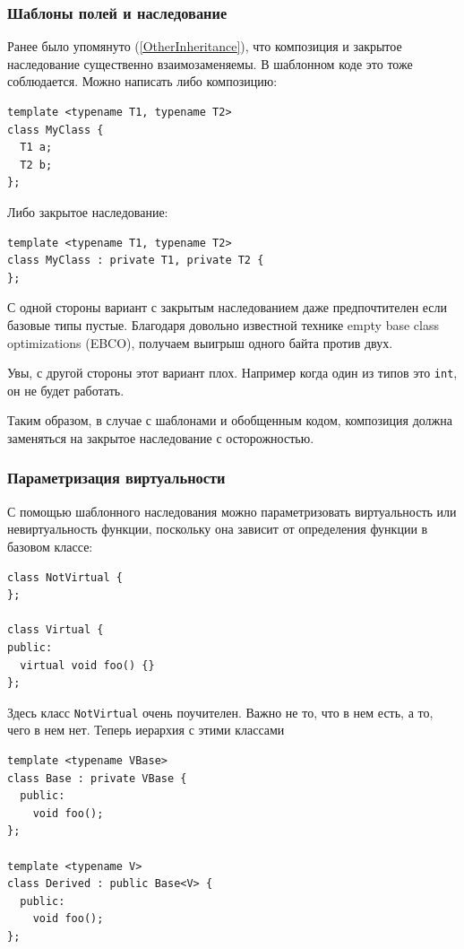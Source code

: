 \documentclass[a4paper,12pt,oneside]{article}
\begin{document}
\subsubsection{Шаблоны полей и наследование}\label{TemplPrivate}

Ранее было упомянуто (\ref{OtherInheritance}), что композиция и закрытое наследование существенно взаимозаменяемы. В шаблонном коде это тоже соблюдается. Можно написать либо композицию:

\begin{lstlisting}
template <typename T1, typename T2> 
class MyClass { 
  T1 a; 
  T2 b; 
}; 
\end{lstlisting}

Либо закрытое наследование:

\begin{lstlisting}
template <typename T1, typename T2> 
class MyClass : private T1, private T2 { 
}; 
\end{lstlisting}

С одной стороны вариант с закрытым наследованием даже предпочтителен если базовые типы пустые. Благодаря довольно известной технике empty base class optimizations (EBCO), получаем выигрыш одного байта против двух.

Увы, с другой стороны этот вариант плох. Например когда один из типов это \lstinline!int!, он не будет работать.

Таким образом, в случае с шаблонами и обобщенным кодом, композиция должна заменяться на закрытое наследование с осторожностью.

\subsubsection{Параметризация виртуальности}

С помощью шаблонного наследования можно параметризовать виртуальность или невиртуальность функции, поскольку она зависит от определения функции в базовом классе:

\begin{lstlisting}
class NotVirtual { 
}; 

class Virtual { 
public: 
  virtual void foo() {} 
}; 
\end{lstlisting}

Здесь класс \lstinline!NotVirtual! очень поучителен. Важно не то, что в нем есть, а то, чего в нем нет. Теперь иерархия с этими классами

\begin{lstlisting}
template <typename VBase> 
class Base : private VBase { 
  public: 
    void foo();
}; 

template <typename V> 
class Derived : public Base<V> { 
  public: 
    void foo();
}; 
\end{lstlisting}
\end{document}
